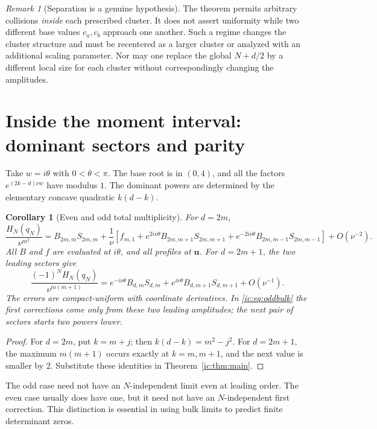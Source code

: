 \documentclass[11pt,a4paper]{article}
\numberwithin{equation}{section}
\newtheorem{corollary}[theorem]{Corollary}
\theoremstyle{definition}
\theoremstyle{remark}
\newtheorem{remark}[theorem]{Remark}
\newcommand{\bu}{\boldsymbol u}
\begin{document}
\begin{remark}[Separation is a genuine hypothesis]
The theorem permits arbitrary collisions \emph{inside} each prescribed
cluster. It does not assert uniformity while two different base values
$c_a,c_b$ approach one another. Such a regime changes the cluster
structure and must be recentered as a larger cluster or analyzed with an
additional scaling parameter. Nor may one replace the global
$N+d/2$ by a different local size for each cluster without correspondingly
changing the amplitudes.
\end{remark}

\section{Inside the moment interval: dominant sectors and parity}
\label{ic:sec:bulk}
Take $w=i\theta$ with $0<\theta<\pi$. The base root is in $(0,4)$, and
all the factors $e^{(2k-d)\nu w}$ have modulus $1$. The dominant powers
are determined by the elementary concave quadratic $k(d-k)$.

\begin{corollary}[Even and odd total multiplicity]\label{ic:cor:bulk}
For $d=2m$,
\begin{equation}\label{ic:eq:evenbulk}
 \frac{H_N(q_N)}{\nu^{m^2}}=
 B_{2m,m}S_{2m,m}+\frac1\nu\left[
 f_{m,1}+e^{2i\nu\theta}B_{2m,m+1}S_{2m,m+1}
 +e^{-2i\nu\theta}B_{2m,m-1}S_{2m,m-1}\right]
 +O(\nu^{-2}).
\end{equation}
All $B$ and $f$ are evaluated at $i\theta$, and all profiles at $\bu$.
For $d=2m+1$, the two leading sectors give
\begin{equation}\label{ic:eq:oddbulk}
 \frac{(-1)^N H_N(q_N)}{\nu^{m(m+1)}}=
 e^{-i\nu\theta}B_{d,m}S_{d,m}
 +e^{i\nu\theta}B_{d,m+1}S_{d,m+1}+O(\nu^{-1}).
\end{equation}
The errors are compact-uniform with coordinate derivatives. In
\eqref{ic:eq:oddbulk} the first corrections come only from these two leading
amplitudes; the next pair of sectors starts two powers lower.
\end{corollary}
\begin{proof}
For $d=2m$, put $k=m+j$; then $k(d-k)=m^2-j^2$. For $d=2m+1$, the maximum
$m(m+1)$ occurs exactly at $k=m,m+1$, and the next value is smaller by
$2$. Substitute these identities in Theorem~\ref{ic:thm:main}.
\end{proof}

The odd case need not have an $N$-independent limit even at leading
order. The even case usually does have one, but it need not have an
$N$-independent first correction. This distinction is essential in using
bulk limits to predict finite determinant zeros.
\end{document}
